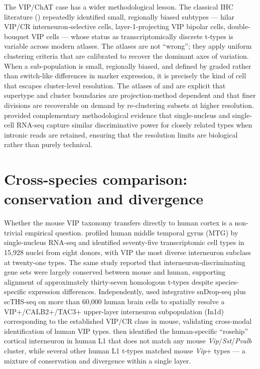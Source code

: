 \documentclass[11pt]{article}
\begin{document}
The VIP/ChAT case has a wider methodological lesson. The classical IHC literature (\citet{Kawaguchi1996, Kawaguchi1997a, Hajos1996}) repeatedly identified small, regionally biased subtypes --- hilar VIP/CR interneuron-selective cells, layer-1-projecting VIP bipolar cells, double-bouquet VIP cells --- whose status as transcriptomically discrete t-types is variable across modern atlases. The atlases are not ``wrong''; they apply uniform clustering criteria that are calibrated to recover the dominant axes of variation. When a sub-population is small, regionally biased, and defined by graded rather than switch-like differences in marker expression, it is precisely the kind of cell that escapes cluster-level resolution. The atlases of \citet{Yao2021a} and \citet{Yao2023} are explicit that supertype and cluster boundaries are projection-method dependent and that finer divisions are recoverable on demand by re-clustering subsets at higher resolution. \citet{Bakken2018} provided complementary methodological evidence that single-nucleus and single-cell RNA-seq capture similar discriminative power for closely related types when intronic reads are retained, ensuring that the resolution limits are biological rather than purely technical.

\section{Cross-species comparison: conservation and divergence}

Whether the mouse VIP taxonomy transfers directly to human cortex is a non-trivial empirical question. \citet{Hodge2019} profiled human middle temporal gyrus (MTG) by single-nucleus RNA-seq and identified seventy-five transcriptomic cell types in 15,928 nuclei from eight donors, with VIP the most diverse interneuron subclass at twenty-one types. The same study reported that interneuron-discriminating gene sets were largely conserved between mouse and human, supporting alignment of approximately thirty-seven homologous t-types despite species-specific expression differences. Independently, \citet{Lake2018} used integrative snDrop-seq plus scTHS-seq on more than 60,000 human brain cells to spatially resolve a VIP+/CALB2+/TAC3+ upper-layer interneuron subpopulation (In1d) corresponding to the established VIP/CR class in mouse, validating cross-modal identification of human VIP types. \citet{Boldog2018} then identified the human-specific ``rosehip'' cortical interneuron in human L1 that does not match any mouse \textit{Vip}/\textit{Sst}/\textit{Pvalb} cluster, while several other human L1 t-types matched mouse \textit{Vip}+ types --- a mixture of conservation and divergence within a single layer.
\end{document}
